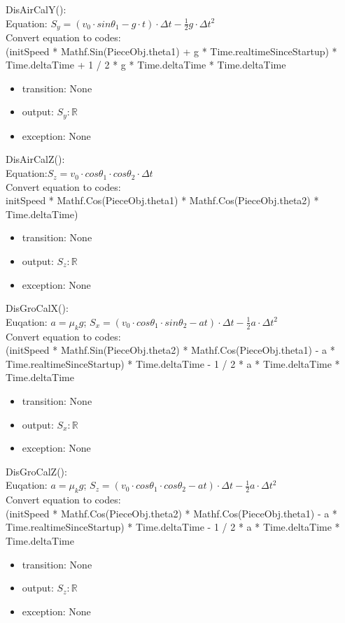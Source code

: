 \documentclass[12pt, titlepage]{article}
\begin{document}
\noindent DisAirCalY():\\
Equation: $S_{y}=(v_{0}\cdot sin\theta _{1} - g \cdot t)\cdot \Delta t-\frac{1}{2}g \cdot \Delta t^{2}$
\\
Convert equation to codes:\\
(initSpeed * Mathf.Sin(PieceObj.theta1) + g * Time.realtimeSinceStartup) * Time.deltaTime + 1 / 2 * g * Time.deltaTime * Time.deltaTime
\begin{itemize}
	\item transition: None
	\item output: $S_{y}: \mathbb{R}$ 
	\item exception: None
\end{itemize}

\noindent DisAirCalZ():\\
Equation:$S_{z}=v_{0}\cdot cos\theta _{1}\cdot cos\theta _{2}\cdot \Delta t$\\
Convert equation to codes:\\
initSpeed * Mathf.Cos(PieceObj.theta1) * Mathf.Cos(PieceObj.theta2) * Time.deltaTime)
\begin{itemize}
	\item transition: None
	\item output: $S_{z}: \mathbb{R}$ 
	\item exception: None
\end{itemize}

\noindent DisGroCalX():\\
Euqation: $a=\mu_{k}g$; $S_{x}=(v_{0}\cdot cos\theta _{1}\cdot sin\theta _{2} - at)\cdot \Delta t-\frac{1}{2}a \cdot \Delta t^{2}$\\
Convert equation to codes:\\
(initSpeed * Mathf.Sin(PieceObj.theta2) * Mathf.Cos(PieceObj.theta1) - a * Time.realtimeSinceStartup) * Time.deltaTime - 1 / 2 * a * Time.deltaTime * Time.deltaTime
\begin{itemize}
	\item transition: None
	\item output: $S_{x}: \mathbb{R}$ 
	\item exception: None 
\end{itemize}

\noindent DisGroCalZ():\\
Euqation: $a=\mu_{k}g$; $S_{z}=(v_{0}\cdot cos\theta _{1}\cdot cos\theta _{2} - at)\cdot \Delta t-\frac{1}{2}a \cdot \Delta t^{2}$\\
Convert equation to codes:\\
(initSpeed * Mathf.Cos(PieceObj.theta2) * Mathf.Cos(PieceObj.theta1) - a * Time.realtimeSinceStartup) * Time.deltaTime - 1 / 2 * a * Time.deltaTime * Time.deltaTime
\begin{itemize}
	\item transition: None
	\item output: $S_{z}: \mathbb{R}$ 
	\item exception: None 
\end{itemize}
\end{document}
